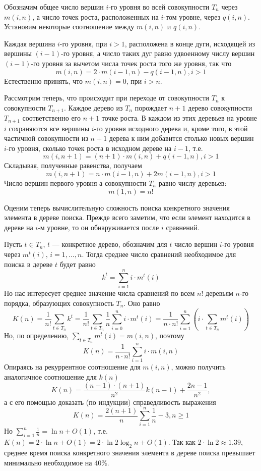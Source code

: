 \documentclass[12pt,a4paper]{article}
\theoremstyle{plain}
\theoremstyle{definition}
\theoremstyle{remark}
\begin{document}
Обозначим общее число вершин $i$-го уровня во всей совокупности $T_n$ через $m(i,n)$, а число точек роста, расположенных на $i$-том уровне, через $q(i,n)$. Установим некоторые соотношение между $m(i,n)$ и $q(i,n)$.

Каждая вершина $i$-го уровня, при $i>1$, расположена в конце дуги, исходящей из вершины $(i-1)$-го уровня, а число таких дуг равно удвоенному числу вершин $(i-1)$-го уровня за вычетом числа точек роста того же уровня, так что
\[ m(i,n) = 2\cdot m(i-1,n) - q(i-1,n), i>1 \]
Естественно принять, что $m(i,n)=0$, при $i>n$.

Рассмотрим теперь, что происходит при переходе от совокупности $T_n$ к совокупности $T_{n+1}$. Каждое дерево из $T_n$ порождает $n+1$ дерево совокупности $T_{n+1}$ соответственно его $n+1$ точке роста. В каждом из этих деревьев на уровне $i$ сохраняются все вершины $i$-го уровня исходного дерева и, кроме того, в этой частичной совокупности из $n+1$ дерева к ним добавится столько новых вершин $i$-го уровня, сколько точек роста в исходном дереве на $i-1$, т.е.
\[ m(i,n+1) = (n+1)\cdot m(i,n)+q(i-1,n), i>1 \]
Складывая, полученные равенства, получаем
\[ m(i,n+1) = n\cdot m(i-1,n)+2m(i-1,n), i>1 \]
Число вершин первого уровня а совокупности $T_n$ равно числу деревьев:
\[ m(1,n)=n! \]

Оценим теперь вычислительную сложность поиска конкретного значения элемента в дереве поиска. Прежде всего заметим, что если элемент находится в дереве на $i$-м уровне, то он обнаруживается после $i$ сравнений.

Пусть $t\in T_n$, $t$ --- конкретное дерево, обозначим для $t$ число вершин $i$-го уровня через $m^t(i)$, $i=1,\ldots,n$. Тогда среднее число сравнений необходимое для поиска в дереве $t$ будет равно
\[ k^t = \sum_{i=1}^n i\cdot m^t(i) \]
Но нас интересует среднее значение числа сравнений по всем $n!$ деревьям $n$-го порядка, образующих совокупность $T_n$. Оно равно
\[ K(n) = \frac{1}{n!} \sum_{t\in T_n} k^t = \frac{1}{n!} \sum_{t\in T_n} \frac{1}{n} \sum_{i=0}^n i \cdot m^t(i) = \frac{1}{n\cdot n!} \sum_{i=1}^n (i \cdot \sum_{t\in T_n} m^t(i)) \]
Но, по определению, $ \sum_{t\in T_n} m^t(i) = m(i, n)$, поэтому
\[ K(n) = \frac{1}{n\cdot n!} \sum_{i=1}^n i\cdot m(i,n) \]
Опираясь на рекуррентное соотношение для $m(i,n)$, можно получить аналогичное соотношение для $k(n)$
\[ K(n) = \frac{(n-1)\cdot(n+1)}{n^2} k(n-1) + \frac{2n-1}{n^2}, \]
а с его помощью доказать (по индукции) справедливость выражения
\[ K(n) = \frac{2(n+1)}{n} \sum_{i=1}^n \frac{1}{n} -3, n \ge 1 \]
Но $\sum_{i=1}^n \frac{1}{n} = \ln n + O(1)$, т.е. $K(n) = 2\cdot\ln n + O(1) = 2\cdot\ln 2 \log_2 n + O(1)$. Так как $2\cdot\ln 2 \approx 1.39$, среднее время поиска конкретного значения элемента в дереве поиска превышает минимально необходимое на 40\%.
\end{document}

